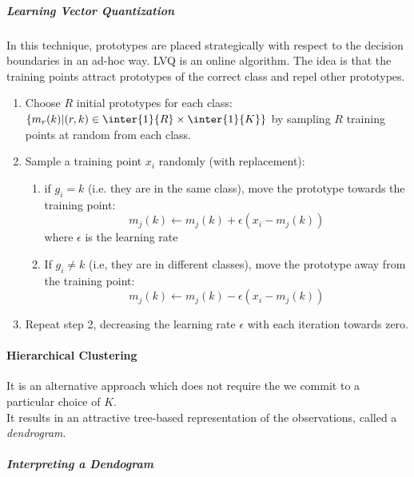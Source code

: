 \subparagraph{Learning Vector Quantization}
In this technique, prototypes are placed strategically with respect to the decision boundaries
in an ad-hoc way. LVQ is an online algorithm. The idea is that the training points attract
prototypes of the correct class and repel other prototypes.
\begin{enumerate}
	\item Choose $R$ initial prototypes for each class: $\left\{m_{r}(k)|(r,k)\in\inter{1}{R}
		\times\inter{1}{K}\right\}$ by sampling $R$ training points at random from each
		class.
	\item Sample a training point $x_{i}$ randomly (with replacement):
		\begin{enumerate}[label=\alph*]
			\item if $g_{i}=k$ (i.e. they are in the same class), move the prototype
				towards the training point:
				$$ m_{j}(k)\leftarrow m_{j}(k) + \epsilon(x_{i}-m_{j}(k))$$
				where $\epsilon$ is the learning rate
			\item If $g_{i}\neq k$ (i.e, they are in different classes), move the 
				prototype away from the training point:
				$$ m_{j}(k)\leftarrow m_{j}(k) - \epsilon(x_{i}-m_{j}(k))$$
		\end{enumerate}
	\item Repeat step 2, decreasing the learning rate $\epsilon$ with each iteration towards
		zero.
\end{enumerate}

\paragraph{Hierarchical Clustering}
It is an alternative approach which does not require the we commit to
a particular choice of $K$.\\
It results in an attractive tree-based representation of the 
observations, called a \emph{dendrogram}.

\subparagraph{Interpreting a Dendogram}


